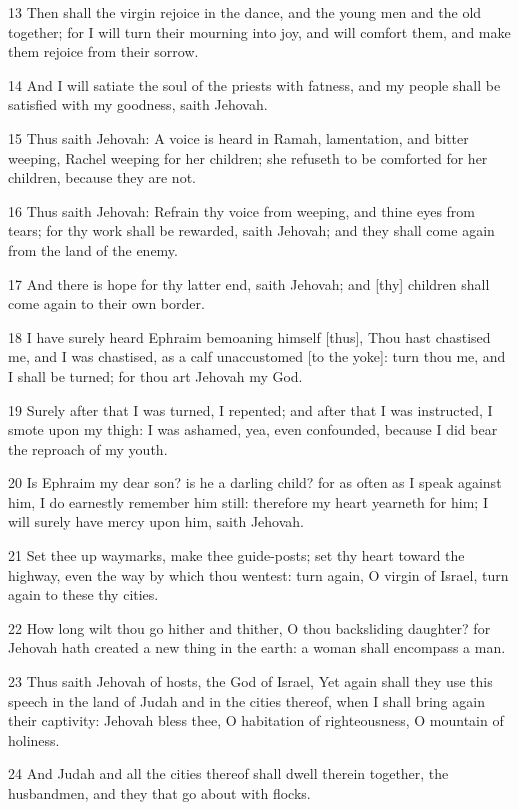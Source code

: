 \par 13 Then shall the virgin rejoice in the dance, and the young men and the old together; for I will turn their mourning into joy, and will comfort them, and make them rejoice from their sorrow.
\par 14 And I will satiate the soul of the priests with fatness, and my people shall be satisfied with my goodness, saith Jehovah.
\par 15 Thus saith Jehovah: A voice is heard in Ramah, lamentation, and bitter weeping, Rachel weeping for her children; she refuseth to be comforted for her children, because they are not.
\par 16 Thus saith Jehovah: Refrain thy voice from weeping, and thine eyes from tears; for thy work shall be rewarded, saith Jehovah; and they shall come again from the land of the enemy.
\par 17 And there is hope for thy latter end, saith Jehovah; and [thy] children shall come again to their own border.
\par 18 I have surely heard Ephraim bemoaning himself [thus], Thou hast chastised me, and I was chastised, as a calf unaccustomed [to the yoke]: turn thou me, and I shall be turned; for thou art Jehovah my God.
\par 19 Surely after that I was turned, I repented; and after that I was instructed, I smote upon my thigh: I was ashamed, yea, even confounded, because I did bear the reproach of my youth.
\par 20 Is Ephraim my dear son? is he a darling child? for as often as I speak against him, I do earnestly remember him still: therefore my heart yearneth for him; I will surely have mercy upon him, saith Jehovah.
\par 21 Set thee up waymarks, make thee guide-posts; set thy heart toward the highway, even the way by which thou wentest: turn again, O virgin of Israel, turn again to these thy cities.
\par 22 How long wilt thou go hither and thither, O thou backsliding daughter? for Jehovah hath created a new thing in the earth: a woman shall encompass a man.
\par 23 Thus saith Jehovah of hosts, the God of Israel, Yet again shall they use this speech in the land of Judah and in the cities thereof, when I shall bring again their captivity: Jehovah bless thee, O habitation of righteousness, O mountain of holiness.
\par 24 And Judah and all the cities thereof shall dwell therein together, the husbandmen, and they that go about with flocks.
